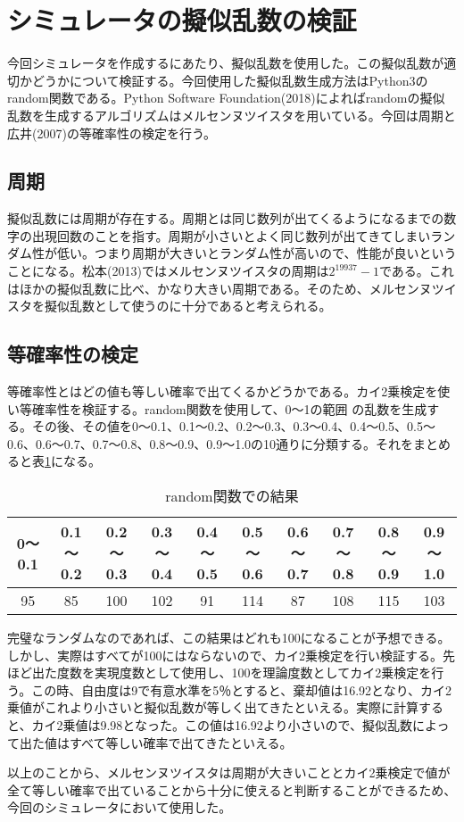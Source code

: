 \section{シミュレータの擬似乱数の検証}
今回シミュレータを作成するにあたり、擬似乱数を使用した。この擬似乱数が適切かどうかについて検証する。今回使用した擬似乱数生成方法はPython3のrandom関数である。Python Software Foundation(2018)によればrandomの擬似乱数を生成するアルゴリズムはメルセンヌツイスタを用いている。今回は周期と広井(2007)の等確率性の検定を行う。
\subsection{周期}
擬似乱数には周期が存在する。周期とは同じ数列が出てくるようになるまでの数字の出現回数のことを指す。周期が小さいとよく同じ数列が出てきてしまいランダム性が低い。つまり周期が大きいとランダム性が高いので、性能が良いということになる。松本(2013)ではメルセンヌツイスタの周期は$2^{19937}-1$である。これはほかの擬似乱数に比べ、かなり大きい周期である。そのため、メルセンヌツイスタを擬似乱数として使うのに十分であると考えられる。
\subsection{等確率性の検定}
等確率性とはどの値も等しい確率で出てくるかどうかである。カイ2乗検定を使い等確率性を検証する。random関数を使用して、0～1の範囲
の乱数を生成する。その後、その値を0～0.1、0.1～0.2、0.2～0.3、0.3～0.4、0.4～0.5、0.5～0.6、0.6～0.7、0.7～0.8、0.8～0.9、0.9～1.0の10通りに分類する。それをまとめると表\ref{table:randomresult}になる。
\begin{table}[H]
 \caption{random関数での結果}
 \label{table:randomresult}
 \begin{center}
  \begin{tabular}{|c|c|c|c|c|c|c|c|c|c|}
    \hline    0～0.1 &  0.1～0.2 & 0.2～0.3 & 0.3～0.4 &  0.4～0.5 & 0.5～0.6 & 0.6～0.7 & 0.7～0.8 & 0.8～0.9 & 0.9～1.0 \\
    \hline 95 & 85 & 100 & 102 & 91 & 114 & 87 & 108 & 115 & 103 \\
    \hline
  \end{tabular}
 \end{center}
\end{table}
完璧なランダムなのであれば、この結果はどれも100になることが予想できる。しかし、実際はすべてが100にはならないので、カイ2乗検定を行い検証する。先ほど出た度数を実現度数として使用し、100を理論度数としてカイ2乗検定を行う。この時、自由度は9で有意水準を5％とすると、棄却値は16.92となり、カイ2乗値がこれより小さいと擬似乱数が等しく出てきたといえる。実際に計算すると、カイ2乗値は9.98となった。この値は16.92より小さいので、擬似乱数によって出た値はすべて等しい確率で出てきたといえる。

以上のことから、メルセンヌツイスタは周期が大きいこととカイ2乗検定で値が全て等しい確率で出ていることから十分に使えると判断することができるため、今回のシミュレータにおいて使用した。
